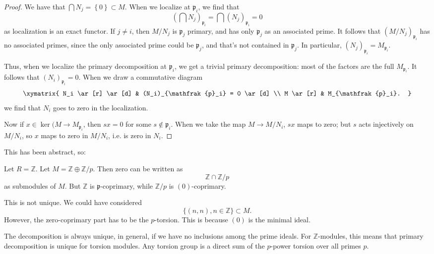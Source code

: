 \begin{proof} 
We have that $\bigcap N_j = \left\{0\right\} \subset M$. When we localize at
$\mathfrak{p}_i$, we find that
\[ (\bigcap N_j)_{\mathfrak{p}_i} = \bigcap (N_j)_{\mathfrak{p}_i} =0 \]
as localization is an exact functor. If $j \neq i$, then $M/N_j$ is
$\mathfrak{p}_j$ primary, and has only $\mathfrak{p}_j$ as an associated prime.
It follows that $(M/N_j)_{\mathfrak{p}_i}$ has no associated primes, since the
only associated prime could be $\mathfrak{p}_j$, and that's not contained in
$\mathfrak{p}_j$.
In particular, $(N_j)_{\mathfrak{p}_i} = M_{\mathfrak{p}_i}$.

Thus, when we localize the primary decomposition at $\mathfrak{p}_i$, we get
a trivial primary decomposition: most of the factors are the full
$M_{\mathfrak{p}_i}$.  It follows that $(N_i)_{\mathfrak{p}_i}=0$. When we draw
a commutative diagram
\[ 
\xymatrix{
N_i \ar[r] \ar[d]  &  (N_i)_{\mathfrak{p}_i} = 0 \ar[d]  \\
M \ar[r] &  M_{\mathfrak{p}_i}.
}
\]
we find that $N_i$ goes to zero in the localization.

Now if $x \in \ker(M \to M_{\mathfrak{p}_i}$, then $sx = 0$ for some $s \notin
\mathfrak{p}_i$. When we take the map $M \to M/N_i$, $sx$ maps to zero; but $s$
acts injectively on $M/N_i$, so $x$ maps to zero in $M/N_i$, i.e. is zero in
$N_i$.
\end{proof} 

This has been abstract, so:
\begin{example} Let $ R = \mathbb{Z}$.
Let $M = \mathbb{Z} \oplus \mathbb{Z}/p$. Then zero can be written as 
\[ \mathbb{Z} \cap \mathbb{Z}/p  \]
as submodules of $M$. But $\mathbb{Z}$ is $\mathfrak{p}$-coprimary, while
$\mathbb{Z}/p$ is $(0)$-coprimary. 

This is not unique. We could have considered 
\[ \{(n,n), n \in \mathbb{Z}\} \subset M.  \]
However, the zero-coprimary part has to be the $p$-torsion. This is because
$(0)$ is the minimal ideal. 

The decomposition is always unique, in general, if
we have no inclusions among the prime ideals. For $\mathbb{Z}$-modules, this
means that primary decomposition is unique for torsion modules. 
Any torsion group is a direct sum of the $p$-power torsion over all primes $p$. 
\end{example} 


